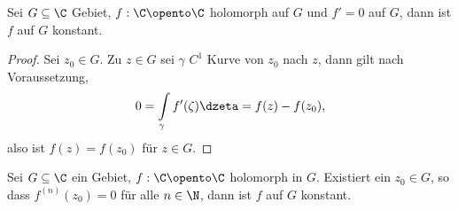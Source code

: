 \begin{prop}
\label{prop:2.47}
Sei $G\subseteq \C$ Gebiet, $f: \C\opento\C$ holomorph auf $G$ und $f'=0$ auf
$G$, dann ist $f$ auf $G$ konstant.\fishhere
\end{prop}
\begin{proof}
Sei $z_0\in G$. Zu $z\in G$ sei $\gamma$ $C^1$ Kurve von $z_0$ nach $z$, dann
gilt nach Voraussetzung,
\begin{align*}
0 = \int\limits_\gamma f'(\zeta)\dzeta = f(z) - f(z_0),
\end{align*}
also ist $f(z) = f(z_0)$ für $z\in G$.\qedhere
\end{proof}

\begin{prop}
\label{prop:2.48}
Sei $G\subseteq\C$ ein Gebiet, $f:\C\opento\C$ holomorph in $G$. Existiert ein
$z_0\in G$, so dass $f^{(n)}(z_0) = 0$ für alle $n\in \N$, dann ist $f$ auf $G$
konstant.\fishhere
\end{prop}
